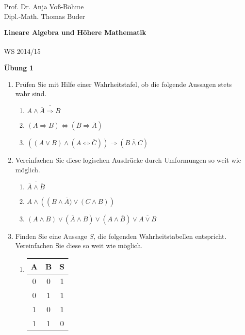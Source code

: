 \documentclass[12pt,a4paper]{scrreprt}
\begin{document}
 
\begin{flushleft}
Prof. Dr.  Anja Voß-Böhme \\
Dipl.-Math. Thomas Buder
\end{flushleft}

\begin{center}{\large\bf Lineare Algebra und Höhere Mathematik} \\ \\ WS 2014/15 \end{center}

\begin{center}{\large\bf Übung 1 } 
\end{center}


\bigskip
\begin{enumerate}

 	\item 	Prüfen Sie mit Hilfe einer Wahrheitstafel, ob die folgende Aussagen stets wahr sind.

	\begin{enumerate}
	 	\item   $A \wedge \overline{\overline{A} \Rightarrow B} $
		\item   $(A \Rightarrow B) \Leftrightarrow ( \overline{B} \Rightarrow \overline{A}) $
		\item   $\left( (A \vee B) \wedge ( A \Leftrightarrow \overline{C})\right)  \Rightarrow ( \overline{B \wedge C}) $
	\end{enumerate}

	\item Vereinfachen Sie diese logischen Ausdrücke durch Umformungen so weit wie möglich.
	
	\begin{enumerate}
		\item   $\overline{ \overline{A} \wedge \overline{B}}$
	 	\item   $A \wedge \left( \left(B \wedge \overline{A}) \vee (C \wedge B) \right)$
		\item $(A \wedge B) \vee (\overline{A} \wedge B) \vee (A \wedge \overline{B}) \vee \overline{ A \vee  B}$
	\end{enumerate}
	
 	\item Finden Sie eine Aussage $S$, die folgenden Wahrheitstabellen entspricht. Vereinfachen Sie diese so weit wie möglich.

\begin{center}

	\begin{enumerate}
		\item
			\begin{tabular}{c c | c}
				A & B & S \\
				\hline 
				0	&0	&1 \\
				0	&1	&1 \\
				1	&0	&1 \\
				1	&1	&0 
			\end{tabular}


\end{enumerate}
\end{center}
\end{enumerate}
\end{document}
